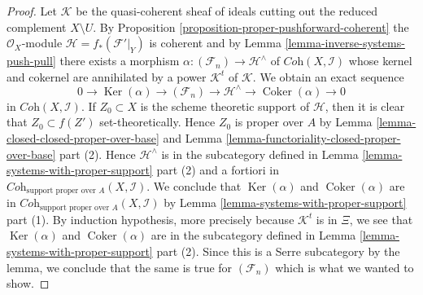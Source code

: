 \documentclass[10pt,a4paper]{amsart}
\theoremstyle{plain}
\theoremstyle{definition}
\theoremstyle{remark}
\numberwithin{equation}{subsection}
\def\Ker{\mathop{\mathrm{Ker}}}
\def\Coker{\mathop{\mathrm{Coker}}}
\begin{document}
\begin{proof}
\medskip\noindent
Let $\mathcal{K}$ be the quasi-coherent sheaf of ideals cutting
out the reduced complement $X \setminus U$. By
Proposition \ref{proposition-proper-pushforward-coherent}
the $\mathcal{O}_X$-module $\mathcal{H} = f_*(\mathcal{F}'|_Y)$ is coherent
and by Lemma \ref{lemma-inverse-systems-push-pull}
there exists a morphism $\alpha : (\mathcal{F}_n) \to \mathcal{H}^\wedge$
of $\textit{Coh}(X, \mathcal{I})$ whose kernel and cokernel are
annihilated by a power $\mathcal{K}^t$ of $\mathcal{K}$.
We obtain an exact sequence
$$
0 \to \Ker(\alpha) \to (\mathcal{F}_n) \to
\mathcal{H}^\wedge \to \Coker(\alpha) \to 0
$$
in $\textit{Coh}(X, \mathcal{I})$. If $Z_0 \subset X$ is the scheme theoretic
support of $\mathcal{H}$, then it is clear that $Z_0 \subset f(Z')$
set-theoretically. Hence $Z_0$ is proper over $A$ by
Lemma \ref{lemma-closed-closed-proper-over-base} and
Lemma \ref{lemma-functoriality-closed-proper-over-base} part (2).
Hence $\mathcal{H}^\wedge$ is in the subcategory defined in
Lemma \ref{lemma-systems-with-proper-support} part (2)
and a fortiori in
$\textit{Coh}_{\text{support proper over }A}(X, \mathcal{I})$.
We conclude that $\Ker(\alpha)$ and $\Coker(\alpha)$
are in $\textit{Coh}_{\text{support proper over }A}(X, \mathcal{I})$
by Lemma \ref{lemma-systems-with-proper-support} part (1).
By induction hypothesis, more precisely because $\mathcal{K}^t$ is in $\Xi$,
we see that $\Ker(\alpha)$ and $\Coker(\alpha)$ are in
the subcategory defined in
Lemma \ref{lemma-systems-with-proper-support} part (2).
Since this is a Serre subcategory by the lemma, we conclude that the
same is true for $(\mathcal{F}_n)$ which is what we wanted to show.
\end{proof}



\end{document}
